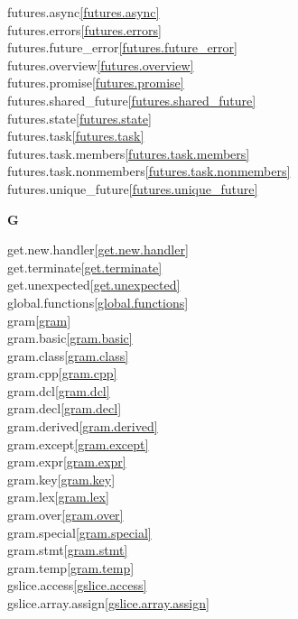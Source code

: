 \begin{multicols}{2}
futures.async\quad\ref{futures.async}\\
futures.errors\quad\ref{futures.errors}\\
futures.future_error\quad\ref{futures.future_error}\\
futures.overview\quad\ref{futures.overview}\\
futures.promise\quad\ref{futures.promise}\\
futures.shared_future\quad\ref{futures.shared_future}\\
futures.state\quad\ref{futures.state}\\
futures.task\quad\ref{futures.task}\\
futures.task.members\quad\ref{futures.task.members}\\
futures.task.nonmembers\quad\ref{futures.task.nonmembers}\\
futures.unique_future\quad\ref{futures.unique_future}\\
\par \textbf{G}\par
get.new.handler\quad\ref{get.new.handler}\\
get.terminate\quad\ref{get.terminate}\\
get.unexpected\quad\ref{get.unexpected}\\
global.functions\quad\ref{global.functions}\\
gram\quad\ref{gram}\\
gram.basic\quad\ref{gram.basic}\\
gram.class\quad\ref{gram.class}\\
gram.cpp\quad\ref{gram.cpp}\\
gram.dcl\quad\ref{gram.dcl}\\
gram.decl\quad\ref{gram.decl}\\
gram.derived\quad\ref{gram.derived}\\
gram.except\quad\ref{gram.except}\\
gram.expr\quad\ref{gram.expr}\\
gram.key\quad\ref{gram.key}\\
gram.lex\quad\ref{gram.lex}\\
gram.over\quad\ref{gram.over}\\
gram.special\quad\ref{gram.special}\\
gram.stmt\quad\ref{gram.stmt}\\
gram.temp\quad\ref{gram.temp}\\
gslice.access\quad\ref{gslice.access}\\
gslice.array.assign\quad\ref{gslice.array.assign}\\

\end{multicols}
